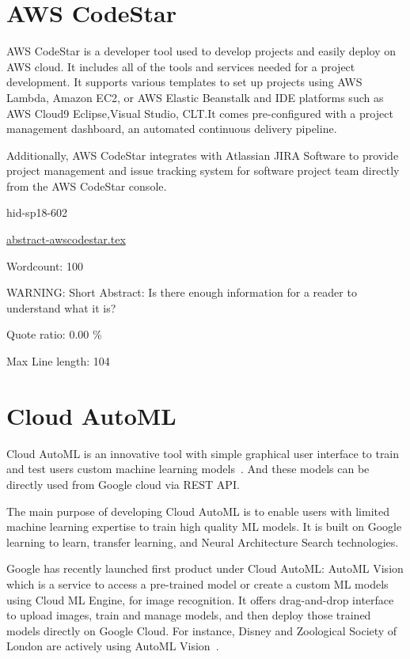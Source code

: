 \section{AWS CodeStar}

AWS CodeStar is a developer tool used to develop projects and easily deploy on 
AWS cloud. It includes all of the tools and services needed for a project development.    
It supports various templates to set up projects using AWS Lambda, Amazon EC2, or AWS Elastic Beanstalk 
and IDE platforms such as AWS Cloud9 Eclipse,Visual Studio, CLT.It comes pre-configured with a 
project management dashboard, an automated continuous delivery pipeline.  

Additionally, AWS CodeStar integrates with Atlassian JIRA Software to 
provide project management and issue tracking system for software project 
team directly from the AWS CodeStar console\cite{hid-sp18-602-www-awscodestar-blog}.



\begin{IU}

hid-sp18-602

\href{https://github.com/cloudmesh-community/hid-sp18-602/blob/master//technology/abstract-awscodestar.tex}{abstract-awscodestar.tex}

 

Wordcount: 100

WARNING: Short Abstract: Is there enough information for a reader to understand what it is?


Quote ratio: 0.00 \%
 
Max Line length: 104
\end{IU}

\section{Cloud AutoML}

Cloud AutoML is an innovative tool with simple graphical user interface to train
and test users custom machine learning models~\cite{hid-sp18-602-www-cloudautoml-main}.
And these models can be directly used from Google cloud via REST API. 

The main purpose of developing Cloud AutoML is to enable users with limited 
machine learning expertise to train high quality ML models. It is built on Google
learning to learn, transfer learning, and Neural Architecture Search 
technologies.

Google has recently launched first product under Cloud AutoML: AutoML Vision 
which is a service to access a pre-trained model or create a custom ML models using
Cloud ML Engine, for image recognition. It offers drag-and-drop interface to 
upload images, train and manage models, and then deploy those trained models 
directly on Google Cloud. For instance, Disney and Zoological Society of London are
actively using AutoML Vision~\cite{hid-sp18-602-wwww-cloudautoml-blog}.



